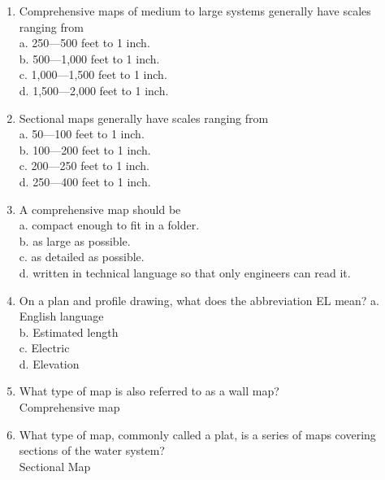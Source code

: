 \begin{enumerate}[1.]
\item Comprehensive maps of medium to large systems generally have scales
ranging from\\
a. 250—500 feet to 1 inch.\\
b. 500—1,000 feet to 1 inch.\\
c. 1,000—1,500 feet to 1 inch.\\
d. 1,500—2,000 feet to 1 inch.\\

\item Sectional maps generally have scales ranging from\\
a. 50—100 feet to 1 inch.\\
b. 100—200 feet to 1 inch.\\
c. 200—250 feet to 1 inch.\\
d. 250—400 feet to 1 inch.\\

\item A comprehensive map should be\\
a. compact enough to fit in a folder.\\
b. as large as possible.\\
c. as detailed as possible.\\
d. written in technical language so that only engineers can read it.\\


\item On a plan and profile drawing, what does the abbreviation EL mean?
a. English language\\
b. Estimated length\\
c. Electric\\
d. Elevation\\



\item What type of map is also referred to as a wall map?\\
Comprehensive map\\

\item What type of map, commonly called a plat, is a series of maps covering sections of the water system?\\
Sectional Map\\
\end{enumerate}
